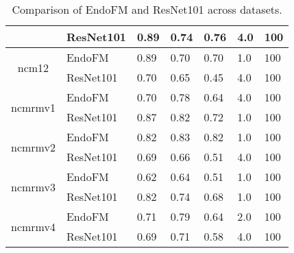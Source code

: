 \begin{table}[h]
\begin{tabular}{cllllll}
     & ResNet101 & 0.89 & 0.74 & 0.76 & 4.0 & 100 \\
    \midrule
    \multirow{2}{*}{ncm12}
 & EndoFM & 0.89 & 0.70 & 0.70 & 1.0 & 100 \\
     & ResNet101 & 0.70 & 0.65 & 0.45 & 4.0 & 100 \\
    \midrule
    \multirow{2}{*}{ncmrmv1}
 & EndoFM & 0.70 & 0.78 & 0.64 & 4.0 & 100 \\
     & ResNet101 & 0.87 & 0.82 & 0.72 & 1.0 & 100 \\
    \midrule
    \multirow{2}{*}{ncmrmv2}
 & EndoFM & 0.82 & 0.83 & 0.82 & 1.0 & 100 \\
     & ResNet101 & 0.69 & 0.66 & 0.51 & 4.0 & 100 \\
    \midrule
    \multirow{2}{*}{ncmrmv3}
 & EndoFM & 0.62 & 0.64 & 0.51 & 1.0 & 100 \\
     & ResNet101 & 0.82 & 0.74 & 0.68 & 1.0 & 100 \\
    \midrule
    \multirow{2}{*}{ncmrmv4}
 & EndoFM & 0.71 & 0.79 & 0.64 & 2.0 & 100 \\
     & ResNet101 & 0.69 & 0.71 & 0.58 & 4.0 & 100 \\
    \midrule
    \bottomrule
    \end{tabular}
    \vspace{-0.1in}
    \caption{Comparison of EndoFM and ResNet101 across datasets.}
    \label{tab:performance_comparison}
\end{table}
